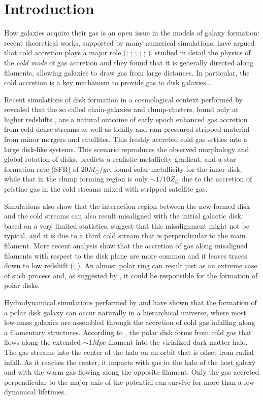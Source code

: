 \documentclass{aa}
\begin{document}
\section{Introduction} \label{intro}

How galaxies acquire their gas is an open issue in the models of
galaxy formation: recent theoretical works, supported by many
numerical simulations, have argued that cold accretion plays a major
role (\citealt{Kat93}; \citealt{Kat94}; \citealt{Ker05};
\citealt{Dek06}; \citealt{Dek08}; \citealt{Bou09}). \citealt{Ker05}
studied in detail the physics of the {\it cold mode} of gas accretion
and they found that it is generally directed along filaments, allowing
galaxies to draw gas from large distances. In particular, the cold
accretion is a key mechanism to provide gas to disk galaxies
\citep{Bro09}.

Recent simulations of disk formation in a cosmological context
performed by \cite{Age09} revealed that the so called chain-galaxies
and clump-clusters, found only at higher redshifts \citep{Elm07}, are
a natural outcome of early epoch enhanced gas accretion from cold
dense streams as well as tidally and ram-pressured stripped material
from minor mergers and satellites. This freshly accreted cold gas
settles into a large disk-like systems. This scenario reproduces the
observed morphology and global rotation of disks, predicts a realistic
metallicity gradient, and a star formation rate (SFR) of $20
M_{\odot}/yr$. \cite{Age09} found solar metallicity for the inner
disk, while that in the clump forming region is only $\sim 1/10
Z_{\odot}$ due to the accretion of pristine gas in the cold streams
mixed with stripped satellite gas.

Simulations also show that the interaction region between the
new-formed disk and the cold streams can also result misaligned with
the initial galactic disk: based on a very limited statistics,
\cite{Age09} suggest that this misalignment might not be typical, and
it is due to a third cold stream that is perpendicular to the main
filament. More recent analysis show that the accretion of gas along
misaligned filaments with respect to the disk plane are more common
and it leaves traces down to low redshift (\citealt{Dek09N};
\citealt{Ros10}). An almost polar ring can result just as an extreme
case of such process and, as suggested by \cite{Age09}, it could be
responsible for the formation of polar disks.

Hydrodynamical
simulations performed by \cite{Mac06} and \cite{Bro08} have shown that
the formation of a polar disk galaxy can occur naturally in a
hierarchical universe, where most low-mass galaxies are assembled
through the accretion of cold gas infalling along a filamentary
structures. According to \cite{Mac06}, the polar disk forms from cold
gas that flows along the extended $\sim 1 Mpc$ filament into the
virialized dark matter halo. The gas streams into the center of the
halo on an orbit that is offset from radial infall. As it reaches the
center, it impacts with gas in the halo of the host galaxy and with
the warm gas flowing along the opposite filament. Only the gas
accreted perpendicular to the major axis of the potential can survive
for more than a few dynamical lifetimes.
\end{document}
